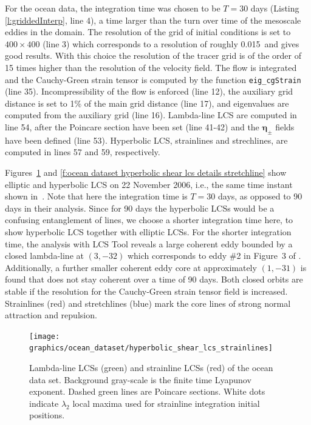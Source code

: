 \documentclass{article}
\begin{document}
For the ocean data, the integration time was chosen to be $T=30$ days (Listing \ref{l:griddedInterp}, line 4), a time larger than the turn over time of the mesoscale eddies in the domain. The resolution of the grid of initial conditions is set to $400\times400$ (line 3) which corresponds to a resolution of roughly 0.015\degree\, and gives good results. With this choice the resolution of the tracer grid is of the order of 15 times higher than the resolution of the velocity field. The flow is integrated and the Cauchy-Green strain tensor is computed by the function \lstinline!eig_cgStrain! (line 35). Incompressibility of the flow is enforced (line 12), the auxiliary grid distance is set to 1\% of the main grid distance (line 17), and eigenvalues are computed from the auxiliary grid (line 16). Lambda-line LCS are computed in line 54, after the Poincare section have been set (line 41-42) and the $\boldsymbol\eta_\pm$ fields have been defined (line 53). Hyperbolic LCS, strainlines and strechlines, are computed in lines 57 and 59, respectively.

Figures~\ref{f:ocean dataset hyperbolic shear lcs details strainline} and \ref{f:ocean dataset hyperbolic shear lcs details stretchline} show elliptic and hyperbolic LCS on 22 November 2006, i.e., the same time instant shown in~\textcite{haller13:_coher_lagran,beron-vera13:_objec_agulh}. Note that here the integration time is $T=30$ days, as opposed to 90 days in their analysis. Since for 90 days the hyperbolic LCSs would be a confusing entanglement of lines, we choose a shorter integration time here, to show hyperbolic LCS together with elliptic LCSs. For the shorter integration time, the analysis with LCS Tool reveals a large coherent eddy bounded by a closed lambda-line at $(3,-32)$ which corresponds to eddy \#2 in Figure~3 of \textcite{beron-vera13:_objec_agulh}. Additionally, a further smaller coherent eddy core at approximately $(1,-31)$ is found that does not stay coherent over a time of 90 days. Both closed orbits are stable if the resolution for the Cauchy-Green strain tensor field is increased. Strainlines (red) and stretchlines (blue) mark the core lines of strong normal attraction and repulsion.

\begin{figure}
\begin{center}
\texttt{[image: graphics/ocean\_dataset/hyperbolic\_shear\_lcs\_strainlines]}
\end{center}
\caption{Lambda-line LCSs (green) and strainline LCSs (red) of the ocean data set. Background gray-scale is the finite time Lyapunov exponent. Dashed green lines are Poincare sections. White dots indicate $\lambda_2$ local maxima used for strainline integration initial positions.}
\label{f:ocean dataset hyperbolic shear lcs details strainline}
\end{figure}
\end{document}
